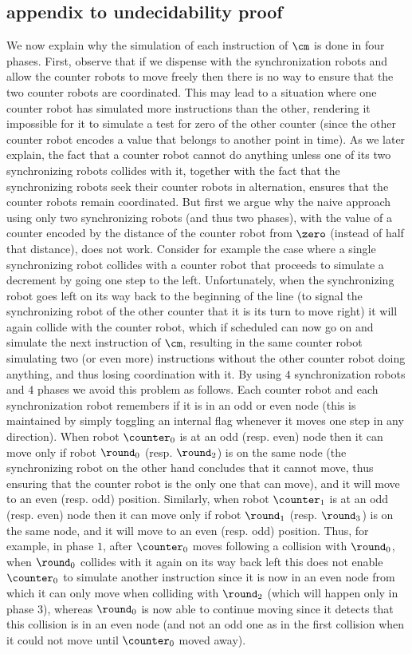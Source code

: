 \subsection{appendix to undecidability proof}

We now explain why the simulation of each instruction of $\cm$ is done in four
phases. First, observe that
if we dispense with the synchronization robots and allow the counter robots to
move freely then there is no way to ensure that the two counter robots are
coordinated. This may lead to a situation where one counter robot has simulated
more instructions than the other, rendering it impossible for it to simulate a
test for zero of the other counter (since the other counter robot encodes a
value that belongs to another point in time). As we later explain, the fact that
a counter robot cannot do anything unless one of its two synchronizing robots
collides with it, together with the fact that the synchronizing robots seek
their counter robots in alternation, ensures that the counter robots remain
coordinated. But first we argue why the naive approach using only two
synchronizing robots (and thus two phases), with the value of a counter encoded
by the distance of the counter robot from $\zero$ (instead of half that
distance), does not work. Consider for example the case where a single
synchronizing robot collides with a counter robot that proceeds to simulate a
decrement by going one step to the left. Unfortunately, when the synchronizing
robot goes left on its way back to the beginning of the line (to signal the
synchronizing robot of the other counter that it is its turn to move right) it
will again collide with the counter robot, which if scheduled can now go on and
simulate the next instruction of $\cm$, resulting in the same counter robot
simulating two (or even more) instructions without the other counter robot doing
anything, and thus losing coordination with it. By using $4$ synchronization
robots and $4$ phases we avoid this problem as follows.
Each counter robot and each synchronization robot remembers if it is in an odd
or even node (this is maintained by simply toggling an internal flag whenever it
moves one step in any direction). When robot $\counter_0$ is at an odd (resp.
even) node then it can move only if robot $\round_0$ (resp. $\round_2$) is on
the same node (the synchronizing robot on the other hand concludes that it
cannot move, thus ensuring that the counter robot is the only one that can
move), and it will move to an even (resp. odd) position. Similarly, when robot
$\counter_1$ is at an odd (resp. even) node then it can move only if robot
$\round_1$ (resp. $\round_3$) is on the same node, and it will move to an even
(resp. odd) position. Thus, for example, in phase $1$, after $\counter_0$ moves
following a collision with $\round_0$, when $\round_0$ collides with it again on
its way back left this does not enable $\counter_0$ to simulate another
instruction since it is now in an even node from which it can only move when
colliding with $\round_2$ (which will happen only in phase $3$), whereas
$\round_0$ is now able to continue moving since it detects that this collision
is in an even node (and not an odd one as in the first collision when it could
not move until $\counter_0$ moved away).

